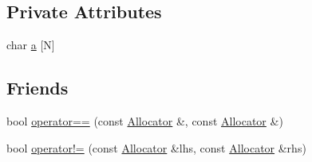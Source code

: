 \subsection*{Private Attributes}
\begin{DoxyCompactItemize}
\item 
char \hyperlink{classAllocator_a5cd222e9e4d8a10d78cd8411ffcf93c2}{a} \mbox{[}N\mbox{]}
\end{DoxyCompactItemize}
\subsection*{Friends}
\begin{DoxyCompactItemize}
\item 
bool \hyperlink{classAllocator_ad178871e3d4888c233e0a39e2fe36982}{operator==} (const \hyperlink{classAllocator}{Allocator} \&, const \hyperlink{classAllocator}{Allocator} \&)
\item 
bool \hyperlink{classAllocator_aa59693ec7b26e5ee0a2a4bc71db20040}{operator!=} (const \hyperlink{classAllocator}{Allocator} \&lhs, const \hyperlink{classAllocator}{Allocator} \&rhs)
\end{DoxyCompactItemize}


